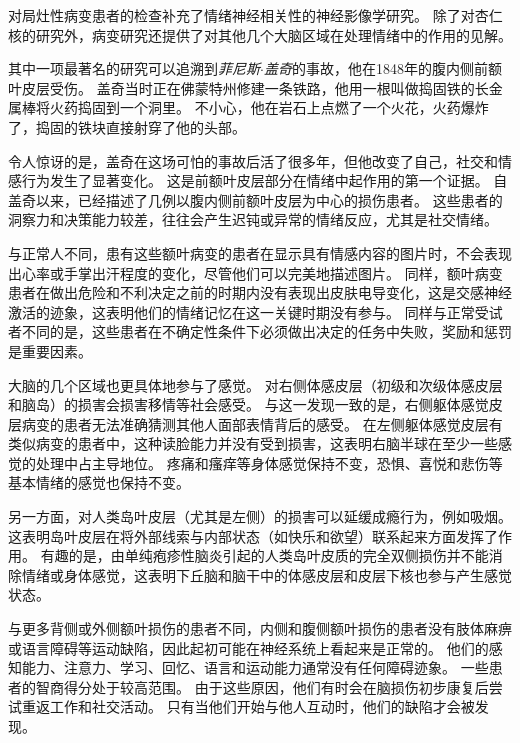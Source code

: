 \begin{proposition}[情绪损伤研究] \label{box:42_2}
	
	\quad \quad 对局灶性病变患者的检查补充了情绪神经相关性的神经影像学研究。
	除了对杏仁核的研究外，病变研究还提供了对其他几个大脑区域在处理情绪中的作用的见解。
	
	\quad \quad 其中一项最著名的研究可以追溯到\textit{菲尼斯$\cdot$盖奇}的事故，他在1848年的腹内侧前额叶皮层受伤。
	盖奇当时正在佛蒙特州修建一条铁路，他用一根叫做捣固铁的长金属棒将火药捣固到一个洞里。
	不小心，他在岩石上点燃了一个火花，火药爆炸了，捣固的铁块直接射穿了他的头部。
	
	\quad \quad 令人惊讶的是，盖奇在这场可怕的事故后活了很多年，但他改变了自己，社交和情感行为发生了显著变化。
	这是前额叶皮层部分在情绪中起作用的第一个证据。
	自盖奇以来，已经描述了几例以腹内侧前额叶皮层为中心的损伤患者。
	这些患者的洞察力和决策能力较差，往往会产生迟钝或异常的情绪反应，尤其是社交情绪。
	
	\quad \quad 与正常人不同，患有这些额叶病变的患者在显示具有情感内容的图片时，不会表现出心率或手掌出汗程度的变化，尽管他们可以完美地描述图片。
	同样，额叶病变患者在做出危险和不利决定之前的时期内没有表现出皮肤电导变化，这是交感神经激活的迹象，这表明他们的情绪记忆在这一关键时期没有参与。
	同样与正常受试者不同的是，这些患者在不确定性条件下必须做出决定的任务中失败，奖励和惩罚是重要因素。
	
	\quad \quad 大脑的几个区域也更具体地参与了感觉。
	对右侧体感皮层（初级和次级体感皮层和脑岛）的损害会损害移情等社会感受。
	与这一发现一致的是，右侧躯体感觉皮层病变的患者无法准确猜测其他人面部表情背后的感受。
	在左侧躯体感觉皮层有类似病变的患者中，这种读脸能力并没有受到损害，这表明右脑半球在至少一些感觉的处理中占主导地位。
	疼痛和瘙痒等身体感觉保持不变，恐惧、喜悦和悲伤等基本情绪的感觉也保持不变。
	
	\quad \quad 另一方面，对人类岛叶皮层（尤其是左侧）的损害可以延缓成瘾行为，例如吸烟。
	这表明岛叶皮层在将外部线索与内部状态（如快乐和欲望）联系起来方面发挥了作用。
	有趣的是，由单纯疱疹性脑炎引起的人类岛叶皮质的完全双侧损伤并不能消除情绪或身体感觉，这表明下丘脑和脑干中的体感皮层和皮层下核也参与产生感觉状态。
	
\end{proposition}


与更多背侧或外侧额叶损伤的患者不同，内侧和腹侧额叶损伤的患者没有肢体麻痹或语言障碍等运动缺陷，因此起初可能在神经系统上看起来是正常的。
他们的感知能力、注意力、学习、回忆、语言和运动能力通常没有任何障碍迹象。
一些患者的智商得分处于较高范围。
由于这些原因，他们有时会在脑损伤初步康复后尝试重返工作和社交活动。
只有当他们开始与他人互动时，他们的缺陷才会被发现。


